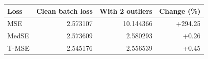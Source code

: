 \begin{tabular}{lrrr}
\toprule
Loss & Clean batch loss & With 2 outliers & Change (\%) \\
\midrule
MSE & 2.573107 & 10.144366 & +294.25 \\
MedSE & 2.573609 & 2.580293 & +0.26 \\
T-MSE & 2.545176 & 2.556539 & +0.45 \\
\bottomrule
\end{tabular}